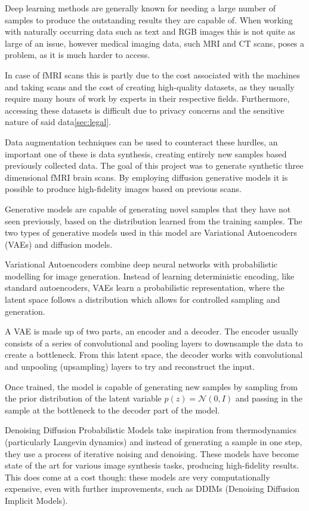 	Deep learning methods are generally known for needing a large number of samples to produce the outstanding results they are capable of\cite{alzubaidi2023survey}. When working with naturally occurring data such as text and RGB images this is not quite as large of an issue, however medical
	imaging data, such MRI and CT scans, poses a problem, as it is much harder to access.
	
	In case of fMRI scans this is partly due to the cost associated with the machines and taking scans and the cost of creating high-quality datasets, as they usually require many hours of work by experts in their respective fields. Furthermore, accessing these datasets is difficult due to privacy concerns and the sensitive nature of said data\ref{sec:legal}.

	Data augmentation techniques can be used to counteract these hurdles, an important one of these is data synthesis, creating entirely new samples based previously collected data. The goal of this project was to generate synthetic three dimensional fMRI brain scans. By employing diffusion generative models it is possible to produce high-fidelity images based on previous scans.
	
	Generative models are capable of generating novel samples that they have not seen previously, based on the distribution learned from the training samples. The two types of generative models used in this model are Variational Autoencoders (VAEs) and diffusion models.
	
	Variational Autoencoders combine deep neural networks with probabilistic modelling for image generation\cite{kingma2013auto}. Instead of learning deterministic encoding, like standard autoencoders\cite{bank2023autoencoders}, VAEs learn a probabilistic representation, where the latent space follows a distribution which allows for controlled sampling and generation.
	
	A VAE is made up of two parts, an encoder and a decoder. The encoder usually consists of a series of convolutional and pooling layers to downsample the data to create a bottleneck. From this latent space, the decoder works with convolutional and unpooling (upsampling) layers to try and reconstruct the input. 
	
	Once trained, the model is capable of generating new samples by sampling from the prior distribution of the latent variable $p(z) = \mathcal{N}(0,I)$ and passing in the sample at the bottleneck to the decoder part of the model.
	
	Denoising Diffusion Probabilistic Models take inspiration from thermodynamics (particularly Langevin dynamics\cite{welling2011bayesian}) and instead of generating a sample in one step, they use a process of iterative noising and denoising\cite{ho2020denoising}. These models have become state of the art for various image synthesis tasks, producing high-fidelity results. This does come at a cost though: these models are very computationally expensive, even with further improvements, such as DDIMs (Denoising Diffusion Implicit Models\cite{song2020denoising}).
	

